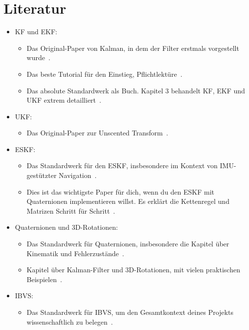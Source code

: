 \documentclass{article}
\begin{document}
\section{Literatur}
\begin{itemize}
    \item KF und EKF: \begin{itemize}
        \item Das Original-Paper von Kalman, in dem der Filter erstmals vorgestellt wurde~\cite{kalman1960new}.
        \item Das beste Tutorial für den Einstieg, Pflichtlektüre~\cite{welch2006introduction}.
        \item Das absolute Standardwerk als Buch. Kapitel 3 behandelt KF, EKF und UKF extrem detailliert~\cite{thrun2005probabilistic}.
    \end{itemize}
    \item UKF: \begin{itemize}
        \item Das Original-Paper zur Unscented Transform~\cite{julier1997new}.
    \end{itemize}
    \item ESKF: \begin{itemize}
        \item Das Standardwerk für den ESKF, insbesondere im Kontext von IMU-gestützter Navigation~\cite{forster2017manifold}.
        \item Dies ist das wichtigste Paper für dich, wenn du den ESKF mit Quaternionen implementieren willst. Es erklärt die Kettenregel und Matrizen Schritt für Schritt~\cite{sola2017quaternion}.
    \end{itemize}
    \item Quaternionen und 3D-Rotationen: \begin{itemize}
        \item Das Standardwerk für Quaternionen, insbesondere die Kapitel über Kinematik und Fehlerzustände~\cite{kuipers1999quaternions}.
        \item Kapitel über Kalman-Filter und 3D-Rotationen, mit vielen praktischen Beispielen~\cite{corke2017robotics}.
    \end{itemize}
    \item IBVS: \begin{itemize}
        \item Das Standardwerk für IBVS, um den Gesamtkontext deines Projekts wissenschaftlich zu belegen~\cite{chaumette2006visual}.
    \end{itemize}

\end{itemize}
\end{document}
